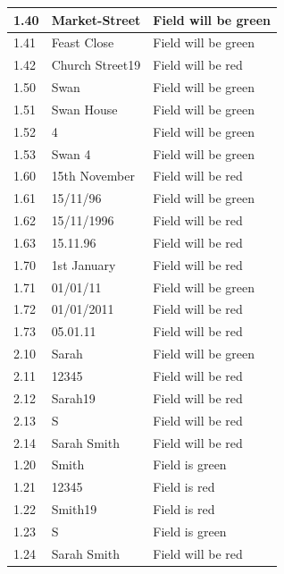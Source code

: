 \begin{landscape}
\begin{center}
\begin{longtable}{|p{2cm}|p{5cm}|p{8cm}|}
        1.40 & Market-Street & Field will be green \\ \hline
        1.41 & Feast Close & Field will be green \\ \hline
        1.42 & Church Street19 & Field will be red\\ \hline
        
        1.50 & Swan & Field will be green \\ \hline
        1.51 & Swan House & Field will be green \\ \hline
        1.52 & 4 & Field will be green \\ \hline
        1.53 & Swan 4 & Field will be green \\ \hline
        
        \rowcolor{darkgrey} 1.60 & 15th November & Field will be red \\ \hline
        \rowcolor{darkgrey} 1.61 & 15/11/96 & Field will be green \\ \hline
        \rowcolor{darkgrey} 1.62 & 15/11/1996 & Field will be red \\ \hline
        \rowcolor{darkgrey} 1.63 & 15.11.96 & Field will be red \\ \hline
        
        \rowcolor{darkgrey} 1.70 & 1st January & Field will be red \\ \hline
        \rowcolor{darkgrey} 1.71 & 01/01/11 & Field will be green \\ \hline
        \rowcolor{darkgrey} 1.72 & 01/01/2011 & Field will be red \\ \hline
        \rowcolor{darkgrey} 1.73 & 05.01.11 & Field will be red \\ \hline
        
        2.10 & Sarah & Field will be green \\ \hline
        2.11 & 12345 & Field will be red \\ \hline
        2.12 & Sarah19 & Field will be red \\ \hline
        2.13 & S & Field will be red\\ \hline
        2.14 & Sarah Smith &  Field will be red\\ \hline
        
        1.20 & Smith & Field is green \\ \hline
        1.21 & 12345 & Field is red \\ \hline
        1.22 & Smith19 & Field is red \\ \hline
        1.23 & S & Field is green\\ \hline
        1.24 & Sarah Smith &  Field will be red\\ \hline
        

\end{longtable}
\end{center}
\end{landscape}
